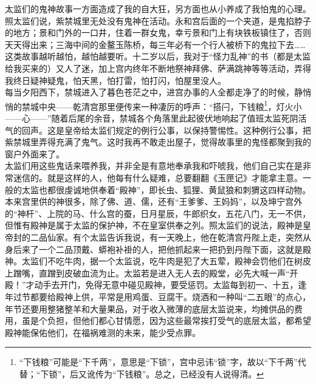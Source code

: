 太监们的鬼神故事一方面造成了我的自大狂，另方面也从小养成了我怕鬼的心理。照太监们说，紫禁城里无处没有鬼神在活动。永和宫后面的一个夹道，是鬼掐脖子的地方；景和门外的一口井，住着一群女鬼，幸亏景和门上有块铁板镇住了，否则天天得出来；三海中间的金鳌玉陈桥，每三年必有一个行人被桥下的鬼拉下去……这类故事越听越怕，越怕越要听。十二岁以后，我对于“怪力乱神”的书（都是太监给我买来的）又人了迷，加上宫内终年不断地祭神拜佛、萨满跳神等等活动，弄得我终日疑神疑鬼，怕天黑，怕打雷，怕打闪，怕屋里没人。\\

每当夕阳西下，禁城进入了暮色苍茫之中，进宫办事的人全都走净了的时候，静悄悄的禁城中央——乾清宫那里便传来一种凄厉的呼声：“搭闩，下钱粮\footnote{“下钱粮”可能是“下千两”，意思是“下锁”，宫中忌讳“锁”字，故以“下千两”代替；“下锁”，后又讹传为“下钱粮”。总之，已经没有人说得清。}，灯火小——心——”随着后尾的余音，禁城各个角落里此起彼伏地响起了值班太监死阴活气的回声。这是皇帝给太监们规定的例行公事，以保持警惕性。这种例行公事，把紫禁城里弄得充满了鬼气。这时我再不敢走出屋子，觉得故事里的鬼怪都聚到我的窗户外面来了。\\

太监们用这些鬼话来喂养我，并非全是有意地奉承我和吓唬我，他们自己实在是非常迷信的。就是这样的人，他每有什么疑难，总要翻翻《玉匣记》才能拿主意。一般的太监也都很虔诚地供奉着“殿神”，即长虫、狐狸、黄鼠狼和刺猬这四样动物。本来宫里供的神很多，除了佛、道、儒，还有“王爹爹、王妈妈”，以及坤宁宫外的“神杆”、上院的马、什么宫的蚕，日月星辰，牛郎织女，五花八门，无一不供，但惟有殿神是属于太监的保护神，不在皇室供奉之列。照太监们的说法，殿神是皇帝封的二品仙家。有个太监告诉我说，有一天晚上，他在乾清宫丹陛上走，突然从身后来了一个二品顶戴、蟒袍补褂的人，把他抓起来一把扔到丹陛下面，这就是殿神。太监们不吃牛肉，据一个太监说，吃牛肉是犯了大五荤，殿神会罚他们在树皮上蹭嘴，直蹭到皮破血流为止。太监若是进入无人去的殿堂，必先大喊一声“开殿！”才动手去开门，免得无意中碰见殿神，要受惩罚。太监每到初一、十五，逢年过节都要给殿神上供，平常是用鸡蛋、豆腐干。烧酒和一种叫“二五眼”的点心，年节还要用整猪整羊和大量果品，对于收入微薄的底层太监说来，均摊供品的费用，虽是个负担，但他们都心甘情愿，因为这些最常挨打受气的底层太监，都希望殿神能保佑他们，在福祸难测的未来，能少受点罪。\\

